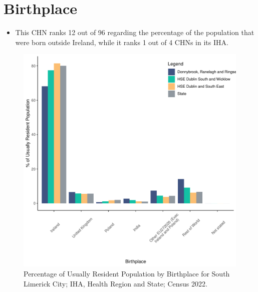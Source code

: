 \documentclass{article}
\begin{document}
\section{Birthplace}\label{sect:Birth}
\begin{itemize}
\item This CHN ranks  12 out of 96 regarding the percentage of the population that were born outside Ireland, while it ranks  1 out of 4 CHNs in its IHA.
\end{itemize}
\begin{figure}[H]
	\centering
	\includegraphics[width = 130mm]{../figures/BirthED.pdf}
	\caption{Percentage of Usually Resident Population by Birthplace for South Limerick City; IHA, Health Region and State; Census 2022.}
	\label{fig:vbnv}
	\end{figure}
	
\end{document}
